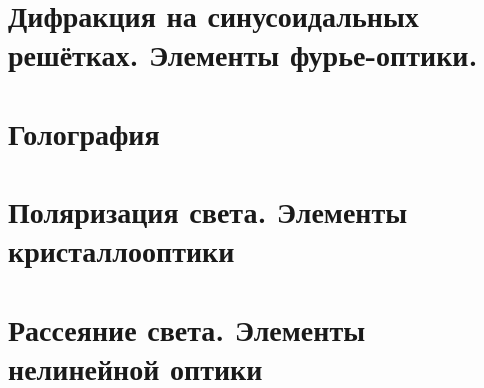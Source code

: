 \maketitle
\newpage

\section{Дифракция на синусоидальных решётках. Элементы фурье-оптики.}






\section{Голография}






\section{Поляризация света. Элементы кристаллооптики}





\section{Рассеяние света. Элементы нелинейной оптики}




